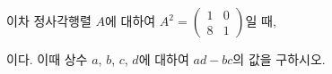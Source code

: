 이차 정사각행렬 $A$에 대하여 $A^2=\begin{pmatrix} 1 & 0 \\ 8 & 1 \end{pmatrix}$일 때,\par\smallskip{}\par\smallskip\noindent 이다. 이때 상수 $a$, $b$, $c$, $d$에 대하여 $ad-bc$의 값을 구하시오.
